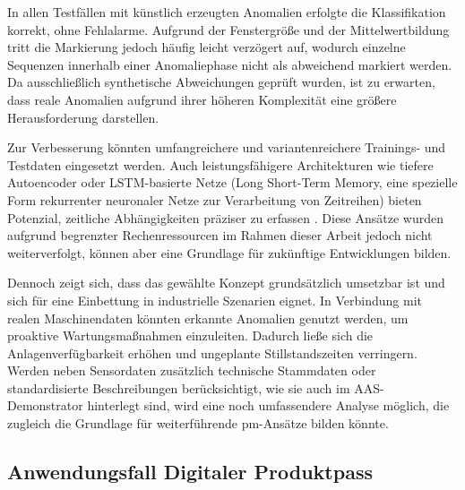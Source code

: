 In allen Testfällen mit künstlich erzeugten Anomalien erfolgte die Klassifikation korrekt, ohne Fehlalarme. 
Aufgrund der Fenstergröße und der Mittelwertbildung tritt die Markierung jedoch häufig leicht verzögert auf, wodurch einzelne Sequenzen innerhalb einer Anomaliephase nicht als abweichend markiert werden. 
Da ausschließlich synthetische Abweichungen geprüft wurden, ist zu erwarten, dass reale Anomalien aufgrund ihrer höheren Komplexität eine größere Herausforderung darstellen.

Zur Verbesserung könnten umfangreichere und variantenreichere Trainings- und Testdaten eingesetzt werden. 
Auch leistungsfähigere Architekturen wie tiefere Autoencoder oder LSTM-basierte Netze (Long Short-Term Memory, eine spezielle Form rekurrenter neuronaler Netze zur Verarbeitung von Zeitreihen) bieten Potenzial, zeitliche Abhängigkeiten präziser zu erfassen \cite{MALEKI2021107443}. 
Diese Ansätze wurden aufgrund begrenzter Rechenressourcen im Rahmen dieser Arbeit jedoch nicht weiterverfolgt, können aber eine Grundlage für zukünftige Entwicklungen bilden.

Dennoch zeigt sich, dass das gewählte Konzept grundsätzlich umsetzbar ist und sich für eine Einbettung in industrielle Szenarien eignet. 
In Verbindung mit realen Maschinendaten könnten erkannte Anomalien genutzt werden, um proaktive Wartungsmaßnahmen einzuleiten. 
Dadurch ließe sich die Anlagenverfügbarkeit erhöhen und ungeplante Stillstandszeiten verringern.
Werden neben Sensordaten zusätzlich technische Stammdaten oder standardisierte Beschreibungen berücksichtigt, wie sie auch im AAS-Demonstrator hinterlegt sind, wird eine noch umfassendere Analyse möglich, die zugleich die Grundlage für weiterführende \acs{pm}-Ansätze bilden könnte.

\newpage
\subsection{Anwendungsfall Digitaler Produktpass}

